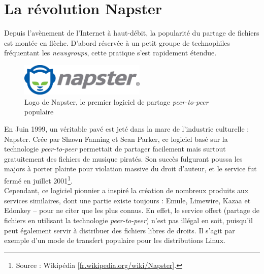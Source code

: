 \documentclass[a4paper]{report}
\begin{document}
	\section{La révolution Napster}
	Depuis l'avènement de l'Internet à haut-débit, la popularité du partage de fichiers est montée en flèche. D'abord réservée à un petit groupe de technophiles fréquentant les \emph{newsgroups}, cette pratique s'est rapidement étendue.

	\begin{figure}[ht]
		\begin{center}
			\includegraphics[width=6cm]{images/logos/napster.jpg}
			\caption{Logo de Napster, le premier logiciel de partage \emph{peer-to-peer} populaire}
		\end{center}
	\end{figure}

	En Juin 1999, un véritable pavé est jeté dans la mare de l'industrie culturelle : Napster. Crée par Shawn Fanning et Sean Parker, ce logiciel basé sur la technologie \emph{peer-to-peer} permettait de partager facilement mais surtout gratuitement des fichiers de musique piratés. Son succès fulgurant poussa les majors à porter plainte pour violation massive du droit d'auteur, et le service fut fermé en juillet 2001\footnote{Source : Wikipédia [\href{http://fr.wikipedia.org/wiki/Napster}{fr.wikipedia.org/wiki/Napster}].}.\\

	Cependant, ce logiciel pionnier a inspiré la création de nombreux produits aux services similaires, dont une partie existe toujours : Emule, Limewire, Kazaa et Edonkey – pour ne citer que les plus connus. En effet, le service offert (partage de fichiers en utilisant la technologie \emph{peer-to-peer}) n'est pas illégal en soit, puisqu'il peut également servir à distribuer des fichiers libres de droits. Il s'agit par exemple d'un mode de transfert populaire pour les distributions Linux.

\end{document}
